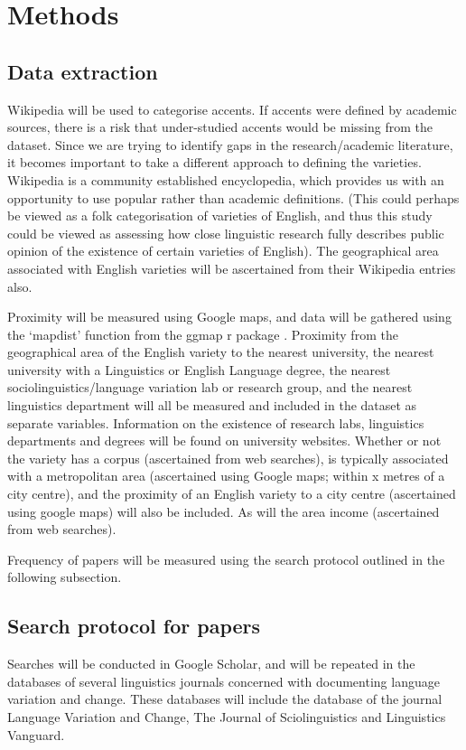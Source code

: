 \documentclass[review]{article}
\begin{document}
	
\section{Methods}




\subsection{Data extraction}
Wikipedia will be used to categorise accents. If accents were defined by academic sources, there is a risk that under-studied accents would be missing from the dataset. Since we are trying to identify gaps in the research/academic literature, it becomes important to take a different approach to defining the varieties. Wikipedia is a community established encyclopedia, which provides us with an opportunity to use popular rather than academic definitions. (This could perhaps be viewed as a folk categorisation of varieties of English, and thus this study could be viewed as assessing how close linguistic research fully describes public opinion of the existence of certain varieties of English). The geographical area associated with English varieties will be ascertained from their Wikipedia entries also.

Proximity will be measured using Google maps, and data will be gathered using the `mapdist' function from the ggmap r package \cite{kahle2013ggmap,R2018}. Proximity from the geographical area of the English variety to the nearest university, the nearest university with a Linguistics or English Language degree, the nearest sociolinguistics/language variation lab or research group, and the nearest linguistics department will all be measured and included in the dataset as separate variables. Information on the existence of research labs, linguistics departments and degrees will be found on university websites. Whether or not the variety has a corpus (ascertained from web searches), is typically associated with a metropolitan area (ascertained using Google maps; within x metres of a city centre), and the proximity of an English variety to a city centre (ascertained using google maps) will also be included. As will the area income (ascertained from web searches).

Frequency of papers will be measured using the search protocol outlined in the following subsection. 

\subsection{Search protocol for papers}
Searches will be conducted in Google Scholar, and will be repeated in the databases of several linguistics journals concerned with documenting language variation and change. These databases will include the database of the journal Language Variation and Change, The Journal of Sciolinguistics and Linguistics Vanguard.
\end{document}
